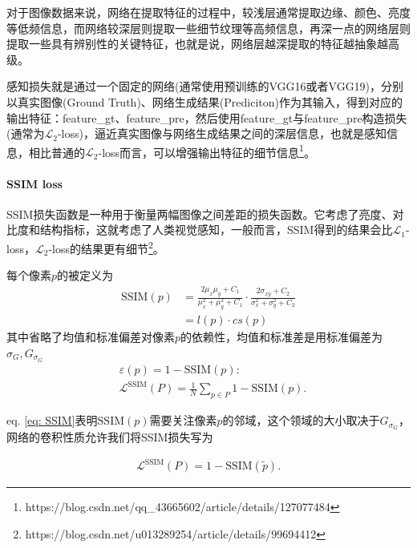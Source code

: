 \documentclass[letterpaper,12pt]{article}
\begin{document}
			对于图像数据来说，网络在提取特征的过程中，较浅层通常提取边缘、颜色、亮度等低频信息，而网络较深层则提取一些细节纹理等高频信息，再深一点的网络层则提取一些具有辨别性的关键特征，也就是说，网络层越深提取的特征越抽象越高级。
			
			感知损失就是通过一个固定的网络(通常使用预训练的VGG16或者VGG19)，分别以真实图像(Ground Truth)、网络生成结果(Prediciton)作为其输入，得到对应的输出特征：feature\_gt、feature\_pre，然后使用feature\_gt与feature\_pre构造损失(通常为$\mathcal{L}_2$-loss)，逼近真实图像与网络生成结果之间的深层信息，也就是感知信息，相比普通的$\mathcal{L}_2$-loss而言，可以增强输出特征的细节信息\footnote{https://blog.csdn.net/qq\_43665602/article/details/127077484}。

			\paragraph{SSIM loss}
			
			SSIM损失函数是一种用于衡量两幅图像之间差距的损失函数。它考虑了亮度、对比度和结构指标，这就考虑了人类视觉感知，一般而言，SSIM得到的结果会比$\mathcal{L}_1$-loss，$\mathcal{L}_2$-loss的结果更有细节\footnote{https://blog.csdn.net/u013289254/article/details/99694412}。
			
			每个像素$p$的被定义为
			\begin{equation}
				\begin{aligned}
				\text{SSIM}(p) &= \frac{2\mu_{x}\mu_{y}+C_{1}}{\mu_{x}^2+\mu_{y}^2+C_{1}} \cdot \frac{2\sigma_{xy}+C_{2}}{\sigma_{x}^2+\sigma_{y}^{2}+C_{2}} \\
				&= l(p)\cdot cs(p)
				\end{aligned}
				\label{eq: SSIM}
			\end{equation}
			其中省略了均值和标准偏差对像素$p$的依赖性，均值和标准差是用标准偏差为$\sigma_G,G_{\sigma_G}$
			\begin{equation}
				\begin{aligned}
					&\varepsilon(p)=1-\text{SSIM}(p): \\  &\mathcal{L}^{\text{SSIM}}(P)=\frac{1}{N}\sum_{p \in P}1-\text{SSIM}(p).
				\end{aligned}
				\label{eq: SSIM loss}
			\end{equation}
			
			eq. \ref{eq: SSIM}表明$\text{SSIM}(p)$需要关注像素$p$的邻域，这个领域的大小取决于$G_{\sigma_G}$，网络的卷积性质允许我们将SSIM损失写为
			
			\begin{equation}
			\begin{aligned}
				\mathcal{L}^{\text{SSIM}}(P)=1-\text{SSIM}(\tilde{p}).
			\end{aligned}
			\label{eq: revised_SSIM loss}
			\end{equation}
			
\end{document}
